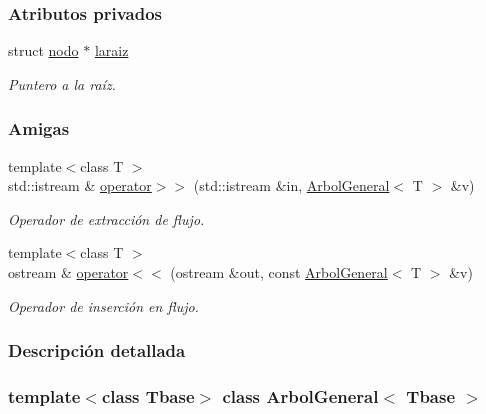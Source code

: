 \subsubsection*{Atributos privados}
\begin{DoxyCompactItemize}
\item 
struct \hyperlink{structArbolGeneral_1_1nodo}{nodo} $\ast$ \hyperlink{classArbolGeneral_a14a859dc79b8df4d5a77b5c871713c9e}{laraiz}
\begin{DoxyCompactList}\small\item\em Puntero a la raíz. \end{DoxyCompactList}\end{DoxyCompactItemize}
\subsubsection*{Amigas}
\begin{DoxyCompactItemize}
\item 
{\footnotesize template$<$class T $>$ }\\std\+::istream \& \hyperlink{classArbolGeneral_ab1318141f030856da7dcfc1c7a162565}{operator$>$$>$} (std\+::istream \&in, \hyperlink{classArbolGeneral}{Arbol\+General}$<$ T $>$ \&v)
\begin{DoxyCompactList}\small\item\em Operador de extracción de flujo. \end{DoxyCompactList}\item 
{\footnotesize template$<$class T $>$ }\\ostream \& \hyperlink{classArbolGeneral_a2b19e120d650b0363eed1bfd8c7f5351}{operator$<$$<$} (ostream \&out, const \hyperlink{classArbolGeneral}{Arbol\+General}$<$ T $>$ \&v)
\begin{DoxyCompactList}\small\item\em Operador de inserción en flujo. \end{DoxyCompactList}\end{DoxyCompactItemize}


\subsubsection{Descripción detallada}
\subsubsection*{template$<$class Tbase$>$\newline
class Arbol\+General$<$ Tbase $>$}


